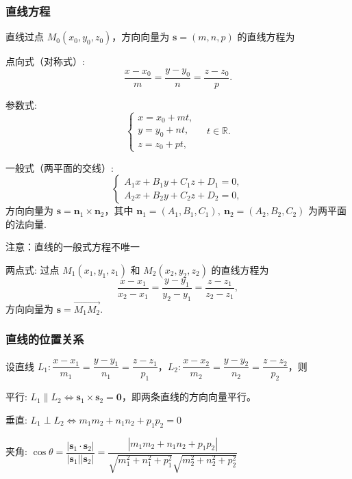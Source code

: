 \subsubsection{直线方程}
直线过点 $M_0(x_0,y_0,z_0)$，方向向量为 $\boldsymbol{s}=(m,n,p)$ 的直线方程为
\begin{zs}
    点向式（对称式）: 
  \[
  \dfrac{x-x_0}{m}=\dfrac{y-y_0}{n}=\dfrac{z-z_0}{p}.
  \]
\end{zs}
\begin{zs}
    参数式:
  \[
  \begin{cases}
  x=x_0+mt, \\
  y=y_0+nt, \\
  z=z_0+pt,
  \end{cases}
  \quad t\in\mathbb{R}.
  \]
\end{zs}
\begin{zs}
    一般式（两平面的交线）:
  \[
  \begin{cases}
  A_1x+B_1y+C_1z+D_1=0, \\
  A_2x+B_2y+C_2z+D_2=0,
  \end{cases}
  \]
  方向向量为 $\boldsymbol{s} = \boldsymbol{n}_1 \times \boldsymbol{n}_2$，其中 $\boldsymbol{n}_1=(A_1,B_1,C_1),\ \boldsymbol{n}_2=(A_2,B_2,C_2)$ 为两平面的法向量.

注意：直线的一般式方程不唯一
\end{zs}
\begin{zs}
    两点式: 过点 $M_1(x_1,y_1,z_1)$ 和 $M_2(x_2,y_2,z_2)$ 的直线方程为
  \[
  \dfrac{x-x_1}{x_2-x_1}=\dfrac{y-y_1}{y_2-y_1}=\dfrac{z-z_1}{z_2-z_1},
  \]
  方向向量为 $\boldsymbol{s} = \overrightarrow{M_1M_2}$.
\end{zs}
\subsubsection{直线的位置关系}
设直线 $L_1: \dfrac{x-x_1}{m_1}=\dfrac{y-y_1}{n_1}=\dfrac{z-z_1}{p_1}$，$L_2: \dfrac{x-x_2}{m_2}=\dfrac{y-y_2}{n_2}=\dfrac{z-z_2}{p_2}$，则
\begin{zs}
    平行: $L_1 \parallel L_2 \Leftrightarrow \boldsymbol{s}_1\times\boldsymbol{s}_2=\boldsymbol{0}$，即两条直线的方向向量平行。
\end{zs}
\begin{zs}
    垂直: $L_1 \perp L_2 \Leftrightarrow m_1m_2+n_1n_2+p_1p_2=0$
\end{zs}
\begin{zs}
    夹角: $\cos\theta=\dfrac{|\boldsymbol{s}_1\cdot\boldsymbol{s}_2|}{|\boldsymbol{s}_1||\boldsymbol{s}_2|}=\dfrac{|m_1m_2+n_1n_2+p_1p_2|}{\sqrt{m_1^2+n_1^2+p_1^2}\sqrt{m_2^2+n_2^2+p_2^2}}$
\end{zs}
